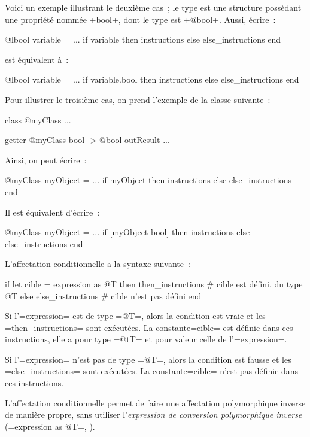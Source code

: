 Voici un exemple illustrant le deuxième cas~; le type  est une structure possèdant une propriété nommée \ggst+bool+, dont le type est \ggst+@bool+. Aussi, écrire~:

\begin{galgas3}
@lbool variable = ...
if variable then
  instructions
else
  else_instructions
end
\end{galgas3}


est équivalent à~:
\begin{galgas3}
@lbool variable = ...
if variable.bool then
  instructions
else
  else_instructions
end
\end{galgas3}


Pour illustrer le troisième cas, on prend l'exemple de la classe suivante~:
\begin{galgas3}
class @myClass { ... }

getter @myClass bool -> @bool outResult { ... }
\end{galgas3}

Ainsi, on peut écrire~:
\begin{galgas3}
@myClass myObject = ...
if myObject then
  instructions
else
  else_instructions
end
\end{galgas3}


Il est équivalent d'écrire~:
\begin{galgas3}
@myClass myObject = ...
if [myObject bool] then
  instructions
else
  else_instructions
end
\end{galgas3}



L'affectation conditionnelle a la syntaxe suivante~:
\begin{galgas3}
if let cible = expression as @T then
  then_instructions # cible est défini, du type @T
else
  else_instructions # cible n'est pas défini
end
\end{galgas3}

Si l'\ggst=expression= est de type \ggst=@T=, alors la condition est vraie et les \ggst=then_instructions= sont exécutées. La constante\ggst=cible= est définie dans ces instructions, elle a pour type \ggst=@tT= et pour valeur celle de l'\ggst=expression=.

Si l'\ggst=expression= n'est pas de type \ggst=@T=, alors la condition est fausse et les \ggst=else_instructions= sont exécutées. La constante\ggst=cible= n'est pas définie dans ces instructions.

L'affectation conditionnelle permet de faire une affectation polymorphique inverse de manière propre, sans utiliser l'\emph{expression de conversion polymorphique inverse} (\ggst=expression as @T=, ).


